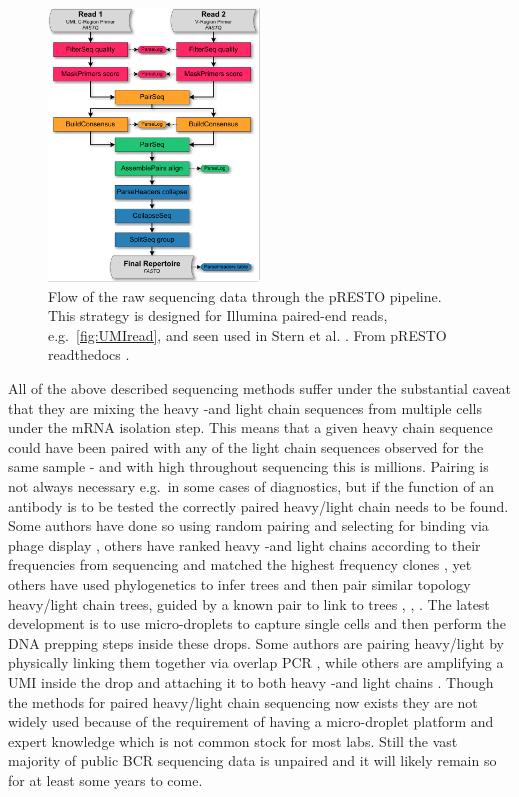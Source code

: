\begin{figure}[ht]
    \centering
    \includegraphics[width=0.5\textwidth]{figures/Stern2014_Flowchart.pdf}
    \caption{
        \label{fig:UMIread_flow}
        Flow of the raw sequencing data through the pRESTO pipeline. This strategy is designed for Illumina paired-end reads, e.g.\ \ref{fig:UMIread}, and seen used in Stern et al. \cite{stern2014b}. From pRESTO readthedocs \cite{vander2014presto}.
    }
\end{figure}


All of the above described sequencing methods suffer under the substantial caveat that they are mixing the heavy -and light chain sequences from multiple cells under the mRNA isolation step.
This means that a given heavy chain sequence could have been paired with any of the light chain sequences observed for the same sample - and with high throughout sequencing this is millions.
Pairing is not always necessary e.g.\ in some cases of diagnostics, but if the function of an antibody is to be tested the correctly paired heavy/light chain needs to be found.
Some authors have done so using random pairing and selecting for binding via phage display \cite{glanville2009precise}, others have ranked heavy -and light chains according to their frequencies from sequencing and matched the highest frequency clones \cite{reddy2010monoclonal}, yet others have used phylogenetics to infer trees and then pair similar topology heavy/light chain trees, guided by a known pair to link to trees \cite{Zhu_undated-zz}, \cite{kwong2017antibodyomics}, \cite{huang2016identification}.
The latest development is to use micro-droplets to capture single cells and then perform the DNA prepping steps inside these drops.
Some authors are pairing heavy/light by physically linking them together via overlap PCR \cite{mcdaniel2016ultra}, while others are amplifying a UMI inside the drop and attaching it to both heavy -and light chains \cite{Briggs134841}.
Though the methods for paired heavy/light chain sequencing now exists they are not widely used because of the requirement of having a micro-droplet platform and expert knowledge which is not common stock for most labs.
Still the vast majority of public BCR sequencing data is unpaired and it will likely remain so for at least some years to come.



